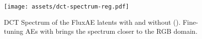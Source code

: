 \begin{figure}
\centering
\texttt{[image: assets/dct-spectrum-reg.pdf]}
\vspace{-0.3cm}
\caption{DCT Spectrum of the FluxAE latents with and without \regname (\regshortname). Fine-tuning AEs with \regshortname brings the spectrum closer to the RGB domain.}
\label{fig:improved-spectrums}
\end{figure}
